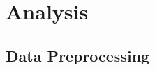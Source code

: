 \documentclass[10pt,a4paper]{article}
\begin{document}
\newpage
\section{Analysis}

\subsection{Data Preprocessing}
%
\end{document}
